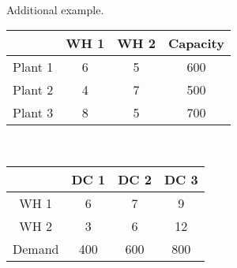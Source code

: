 \documentclass[11pt]{article}
\begin{document}
\\
 
\noindent Additional example.\\

\noindent \begin{table}[h!]
    \centering
    \begin{tabular}{|c|c|c|c|}
    \hline

         & WH 1    & WH 2       &  Capacity        \\ \hline
    Plant 1 & 6    & 5          & 600      \\ \hline
    Plant 2 & 4    & 7          & 500      \\ \hline
    Plant 3 & 8    & 5          & 700      \\ \hline
    \end{tabular}
    \end{table}\\
    \begin{table}[h!]
    \begin{tabular}{|c|c|c|c|}
    \hline
    
           & DC 1    & DC 2       & DC 3    \\ \hline
    WH 1   & 6       & 7          & 9       \\ \hline
    WH 2   & 3       & 6          & 12      \\ \hline
    Demand & 400     & 600        & 800     \\ \hline
    \end{tabular}
    \end{table}\\
\end{document}
